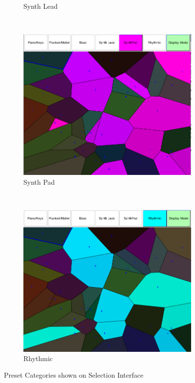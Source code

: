 \documentclass[11pt, oneside]{report}   	%
\begin{document}
\begin{figure}
\begin{subfigure}[b]{0.48\textwidth}
	\caption{Synth Lead}
	\label{fig:categoriesSynthLead}
\end{subfigure}
\\
\begin{subfigure}[b]{0.48\textwidth}
	\includegraphics[width=\textwidth]{CategorySynthPad.png}
	\caption{Synth Pad}
	\label{fig:categoriesSynthPad}
\end{subfigure}
~ %
\begin{subfigure}[b]{0.48\textwidth}
	\includegraphics[width=\textwidth]{CategoryRhythmic.png}
	\caption{Rhythmic}
	\label{fig:categoriesRhythmic}
\end{subfigure}
	\caption{Preset Categories shown on Selection Interface}
	\label{fig:Categories}
\end{figure}
\end{document}
